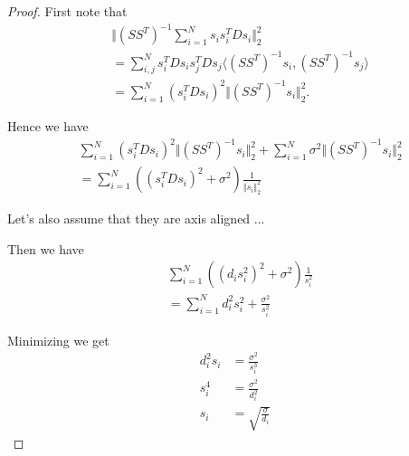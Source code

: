 \begin{proof}
First note that 
\begin{align}
    &\Vert (SS^T)^{-1} \sum_{i = 1}^N s_i s_i^T D s_i \Vert_2^2 \\
    &= \sum_{i, j}^N  s_i^T D s_i s_j^T D s_j  \langle  (SS^T)^{-1} s_i, (SS^T)^{-1} s_j \rangle \\
    &= \sum_{i = 1}^N (s_i^T D s_i)^2 \Vert (SS^T)^{-1} s_i \Vert_2^2.
\end{align}

Hence we have 
\begin{align}
    &\sum_{i = 1}^N (s_i^T D s_i)^2 \Vert (SS^T)^{-1} s_i \Vert_2^2 + \sum_{i = 1}^N \sigma^2 \Vert (SS^T)^{-1} s_i \Vert_2^2 \\
    &= \sum_{i = 1}^N ((s_i^T D s_i)^2 + \sigma^2)  \frac{1}{\Vert s_i \Vert_2^2}
\end{align}

Let's also assume that they are axis aligned ... 

Then we have 
\begin{align}
    &\sum_{i = 1}^N ((d_i s_i^2)^2 + \sigma^2)  \frac{1}{s_i^2} \\
    &= \sum_{i = 1}^N d_i^2 s_i^2 + \frac{\sigma^2}{s_i^2}
\end{align}

Minimizing we get 
\begin{align}
    d_i^2 s_i &= \frac{\sigma^2}{s_i^3} \\
    s_i^4 &= \frac{\sigma^2}{d_i^2} \\
    s_i &= \sqrt{\frac{\sigma}{d_i}}
\end{align}


\end{proof}


